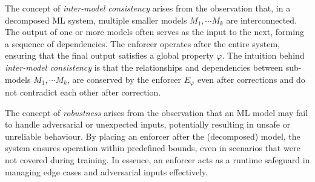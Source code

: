 The concept of \textit{inter-model consistency} arises from the observation that, in a decomposed ML system, multiple smaller models $M_1,\cdots M_k$ are interconnected. The output of one or more models often serves as the input to the next, forming a sequence of dependencies. The enforcer operates after the entire system, ensuring that the final output satisfies a global property $\varphi$. The intuition behind \textit{inter-model consistency} is that the relationships and dependencies between sub-models $M_1,\cdots M_k$, are conserved by the enforcer $E_{\varphi}$ even after corrections and do not contradict each other after correction.



The concept of \textit{robustness} arises from the observation that an ML model may fail to handle adversarial or unexpected inputs, potentially resulting in unsafe or unreliable behaviour. By placing an enforcer after the (decomposed) model, the system ensures operation within predefined bounds, even in scenarios that were not covered during training. In essence, an enforcer acts as a runtime safeguard in managing edge cases and adversarial inputs effectively.

